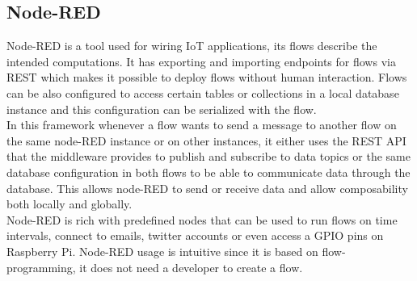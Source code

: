 \subsection{Node-RED}

Node-RED is a tool used for wiring IoT applications, its flows describe the intended computations. It has exporting and importing endpoints for flows via REST which makes it possible to deploy flows without human interaction.  Flows can be also configured to access certain tables or collections in a local database instance and this configuration can be serialized with the flow.\\

\noindent In this framework whenever a flow wants to send a message to another flow on the same node-RED instance or on other instances, it either uses the REST API that the middleware provides to publish and subscribe to data topics or the same database configuration in both flows to be able to communicate data through the database. This allows node-RED to send or receive data and allow composability both locally and globally.\\

\noindent  Node-RED is rich with predefined nodes that  can be used to run flows on time intervals, connect to emails, twitter accounts or even access a GPIO pins on Raspberry Pi. Node-RED usage is intuitive since it is based on flow-programming, it does not need a developer to create a flow.

